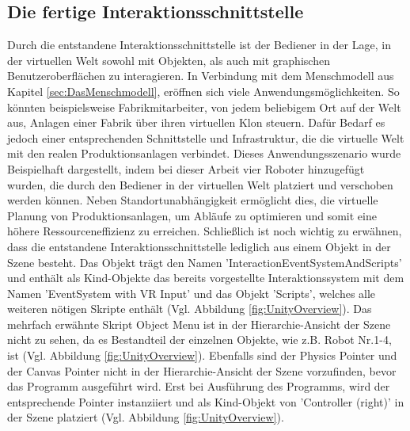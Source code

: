\subsection{Die fertige Interaktionsschnittstelle}\label{sec:ZusammenfassungInteraktion}
Durch die entstandene Interaktionsschnittstelle ist der Bediener in der Lage, in der virtuellen Welt sowohl mit Objekten, als auch mit graphischen Benutzeroberflächen zu interagieren. In Verbindung mit dem Menschmodell aus Kapitel \ref{sec:DasMenschmodell}, eröffnen sich viele Anwendungsmöglichkeiten. So könnten beispielsweise Fabrikmitarbeiter, von jedem beliebigem Ort auf der Welt aus, Anlagen einer Fabrik über ihren virtuellen Klon steuern. Dafür Bedarf es jedoch einer entsprechenden Schnittstelle und Infrastruktur, die die virtuelle Welt mit den realen Produktionsanlagen verbindet. Dieses Anwendungsszenario wurde Beispielhaft dargestellt, indem bei dieser Arbeit vier Roboter hinzugefügt wurden, die durch den Bediener in der virtuellen Welt platziert und verschoben werden können. Neben Standortunabhängigkeit ermöglicht dies, die virtuelle Planung von Produktionsanlagen, um Abläufe zu optimieren und somit eine höhere Ressourceneffizienz zu erreichen.
\newline
Schließlich ist noch wichtig zu erwähnen, dass die entstandene Interaktionsschnittstelle lediglich aus einem Objekt in der Szene besteht. Das Objekt trägt den Namen 'InteractionEventSystemAndScripts' und enthält als Kind-Objekte das bereits vorgestellte Interaktionssystem mit dem Namen 'EventSystem with VR Input' und das Objekt 'Scripts', welches alle weiteren nötigen Skripte enthält (Vgl. Abbildung \ref{fig:UnityOverview}). Das mehrfach erwähnte Skript Object Menu ist in der Hierarchie-Ansicht der Szene nicht zu sehen, da es Bestandteil der einzelnen Objekte, wie z.B. Robot Nr.1-4, ist (Vgl. Abbildung \ref{fig:UnityOverview}). Ebenfalls sind der Physics Pointer und der Canvas Pointer nicht in der Hierarchie-Ansicht der Szene vorzufinden, bevor das Programm ausgeführt wird. Erst bei Ausführung des Programms, wird der entsprechende Pointer instanziiert und als Kind-Objekt von 'Controller (right)' in der Szene platziert (Vgl. Abbildung \ref{fig:UnityOverview}).